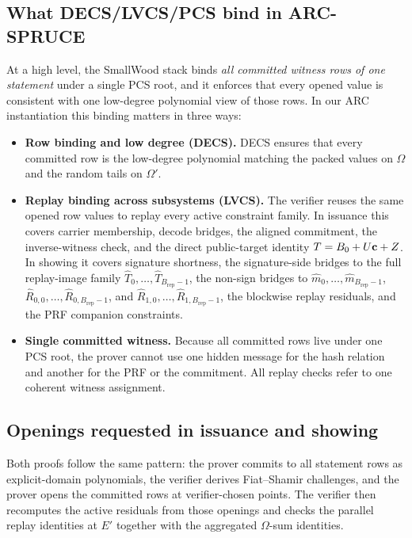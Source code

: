 \subsection{What DECS/LVCS/PCS bind in ARC-SPRUCE}
\label{app:smallwood-binds}
At a high level, the SmallWood stack binds \emph{all committed witness rows of
one statement} under a single PCS root, and it enforces that every opened value
is consistent with one low-degree polynomial view of those rows. In our ARC
instantiation this binding matters in three ways:
\begin{itemize}[leftmargin=1.25em]
  \item \textbf{Row binding and low degree (DECS).}
  DECS ensures that every committed row is the low-degree polynomial matching
  the packed values on \(\Omega\) and the random tails on \(\Omega'\).
  \item \textbf{Replay binding across subsystems (LVCS).}
  The verifier reuses the same opened row values to replay every active
  constraint family. In issuance this covers carrier membership, decode
  bridges, the aligned commitment, the inverse-witness check, and the direct
  public-target identity \(T=B_0+U\mathbf{c}+Z\). In showing it covers
  signature shortness, the signature-side bridges to the full replay-image
  family \(\widehat T_0,\ldots,\widehat T_{B_{\mathrm{rep}}-1}\), the
  non-sign bridges to
  \(\widehat m_0,\ldots,\widehat m_{B_{\mathrm{rep}}-1}\),
  \(\widehat R_{0,0},\ldots,\widehat R_{0,B_{\mathrm{rep}}-1}\), and
  \(\widehat R_{1,0},\ldots,\widehat R_{1,B_{\mathrm{rep}}-1}\), the blockwise
  replay residuals, and the PRF companion constraints.
  \item \textbf{Single committed witness.}
  Because all committed rows live under one PCS root, the prover cannot use one
  hidden message for the hash relation and another for the PRF or the
  commitment. All replay checks refer to one coherent witness assignment.
\end{itemize}

\subsection{Openings requested in issuance and showing}
\label{app:smallwood-openings}
Both proofs follow the same pattern: the prover commits to all statement rows
as explicit-domain polynomials, the verifier derives Fiat--Shamir challenges,
and the prover opens the committed rows at verifier-chosen points. The verifier
then recomputes the active residuals from those openings and checks the
parallel replay identities at \(E'\) together with the aggregated
\(\Omega\)-sum identities.

